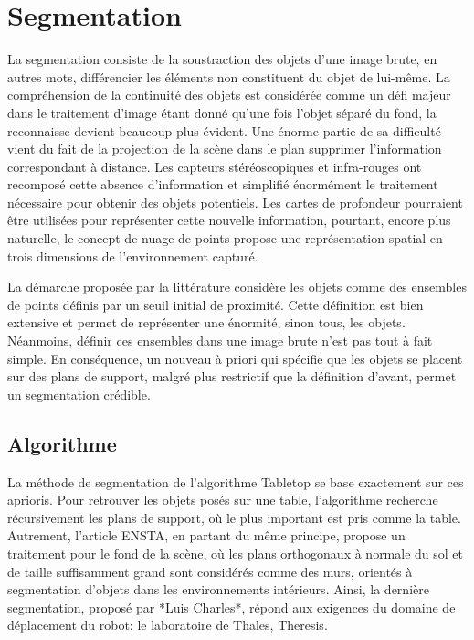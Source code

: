 \section{Segmentation}

La segmentation consiste de la soustraction des objets d'une image brute, en autres mots, différencier les éléments non constituent du
objet de lui-même. La compréhension de la continuité des objets est
considérée comme un défi majeur dans le traitement d'image étant
donné qu'une fois l'objet séparé du fond, la reconnaisse devient
beaucoup plus évident. Une énorme partie de sa difficulté vient du fait
de la projection de la scène dans le plan supprimer l'information
correspondant à distance. Les capteurs stéréoscopiques et
infra-rouges ont recomposé cette absence d'information et simplifié
énormément le traitement nécessaire pour obtenir des objets
potentiels. Les cartes de profondeur pourraient être utilisées pour
représenter cette nouvelle information, pourtant, encore plus
naturelle, le concept de nuage de points propose une représentation
spatial en trois dimensions de l'environnement capturé.

La démarche proposée par la littérature considère les objets comme des
ensembles de points définis par un seuil initial de proximité. Cette
définition est bien extensive et permet de représenter une énormité,
sinon tous, les objets. Néanmoins, définir ces ensembles dans une
image brute n'est pas tout à fait simple. En conséquence, un nouveau à
priori qui spécifie que les objets se placent sur des plans de
support, malgré plus restrictif que la définition d'avant, permet un
segmentation crédible.

\subsection{Algorithme}

La méthode de segmentation de l’algorithme Tabletop
se base exactement sur ces aprioris. Pour retrouver les objets posés
sur une table, l'algorithme recherche récursivement les plans de
support, où le plus important est pris comme la table. Autrement,
l'article {\color{blue}ENSTA}, en partant du même principe, propose un
traitement pour le fond de la scène, où les plans orthogonaux à
normale du sol et de taille suffisamment grand sont considérés comme
des murs, orientés à segmentation d'objets dans les environnements
intérieurs. Ainsi, la dernière segmentation, proposé par *Luis
Charles*, répond aux exigences du domaine de déplacement du robot: le
laboratoire de Thales, Theresis.

